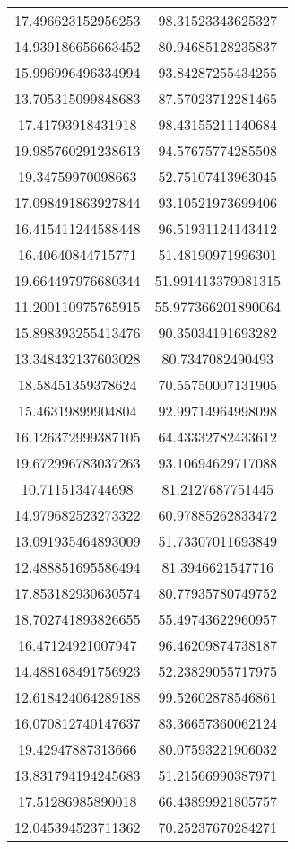 \begin{table}
\begin{tabular}{cc}
17.496623152956253 & 98.31523343625327 \\
14.939186656663452 & 80.94685128235837 \\
15.996996496334994 & 93.84287255434255 \\
13.705315099848683 & 87.57023712281465 \\
17.41793918431918 & 98.43155211140684 \\
19.985760291238613 & 94.57675774285508 \\
19.34759970098663 & 52.75107413963045 \\
17.098491863927844 & 93.10521973699406 \\
16.415411244588448 & 96.51931124143412 \\
16.40640844715771 & 51.48190971996301 \\
19.664497976680344 & 51.991413379081315 \\
11.200110975765915 & 55.977366201890064 \\
15.898393255413476 & 90.35034191693282 \\
13.348432137603028 & 80.7347082490493 \\
18.58451359378624 & 70.55750007131905 \\
15.46319899904804 & 92.99714964998098 \\
16.126372999387105 & 64.43332782433612 \\
19.672996783037263 & 93.10694629717088 \\
10.7115134744698 & 81.2127687751445 \\
14.979682523273322 & 60.97885262833472 \\
13.091935464893009 & 51.73307011693849 \\
12.488851695586494 & 81.3946621547716 \\
17.853182930630574 & 80.77935780749752 \\
18.702741893826655 & 55.49743622960957 \\
16.47124921007947 & 96.46209874738187 \\
14.488168491756923 & 52.23829055717975 \\
12.618424064289188 & 99.52602878546861 \\
16.070812740147637 & 83.36657360062124 \\
19.42947887313666 & 80.07593221906032 \\
13.831794194245683 & 51.21566990387971 \\
17.51286985890018 & 66.43899921805757 \\
12.045394523711362 & 70.25237670284271 \\

\end{tabular}
\end{table}
